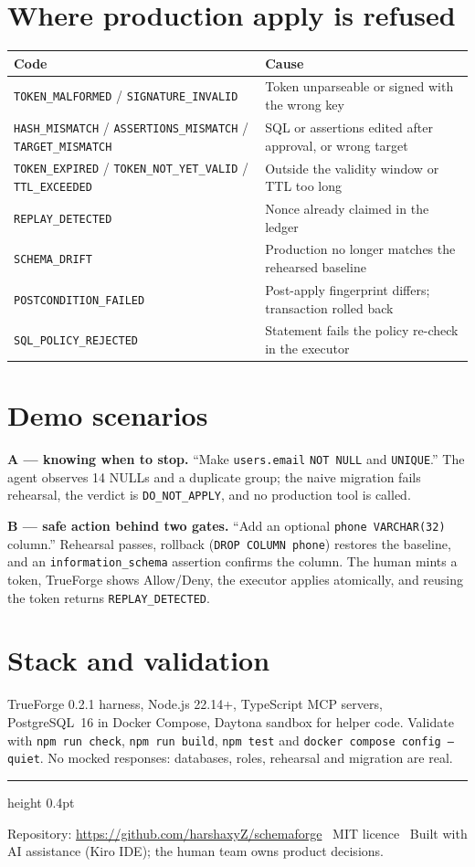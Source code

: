 \documentclass[10pt,a4paper]{article}
\begin{document}
\section*{Where production apply is refused}
\begin{tabularx}{\linewidth}{@{}lX@{}}
\toprule
\textbf{Code} & \textbf{Cause} \\
\midrule
\texttt{TOKEN\_MALFORMED} / \texttt{SIGNATURE\_INVALID} & Token unparseable or signed with the wrong key \\
\texttt{HASH\_MISMATCH} / \texttt{ASSERTIONS\_MISMATCH} / \texttt{TARGET\_MISMATCH} & SQL or assertions edited after approval, or wrong target \\
\texttt{TOKEN\_EXPIRED} / \texttt{TOKEN\_NOT\_YET\_VALID} / \texttt{TTL\_EXCEEDED} & Outside the validity window or TTL too long \\
\texttt{REPLAY\_DETECTED}      & Nonce already claimed in the ledger \\
\texttt{SCHEMA\_DRIFT}         & Production no longer matches the rehearsed baseline \\
\texttt{POSTCONDITION\_FAILED} & Post-apply fingerprint differs; transaction rolled back \\
\texttt{SQL\_POLICY\_REJECTED} & Statement fails the policy re-check in the executor \\
\bottomrule
\end{tabularx}

\section*{Demo scenarios}
\textbf{A --- knowing when to stop.} ``Make \texttt{users.email} \texttt{NOT NULL} and \texttt{UNIQUE}.''
The agent observes 14 NULLs and a duplicate group; the naive migration fails rehearsal, the verdict is
\texttt{DO\_NOT\_APPLY}, and no production tool is called.

\textbf{B --- safe action behind two gates.} ``Add an optional \texttt{phone VARCHAR(32)} column.''
Rehearsal passes, rollback (\texttt{DROP COLUMN phone}) restores the baseline, and an
\texttt{information\_schema} assertion confirms the column. The human mints a token, TrueForge shows
Allow/Deny, the executor applies atomically, and reusing the token returns \texttt{REPLAY\_DETECTED}.

\section*{Stack and validation}
TrueForge 0.2.1 harness, Node.js 22.14+, TypeScript MCP servers, PostgreSQL~16 in Docker Compose,
Daytona sandbox for helper code. Validate with \texttt{npm run check}, \texttt{npm run build}, \texttt{npm test} and
\texttt{docker compose config --quiet}. No mocked responses: databases, roles, rehearsal and migration are real.

\vfill
{\color{sfrule}\hrule height 0.4pt}
\vspace{0.6ex}
{\footnotesize Repository: \url{https://github.com/harshaxyZ/schemaforge} \textperiodcentered\ MIT licence
\textperiodcentered\ Built with AI assistance (Kiro IDE); the human team owns product decisions.}
\end{document}

